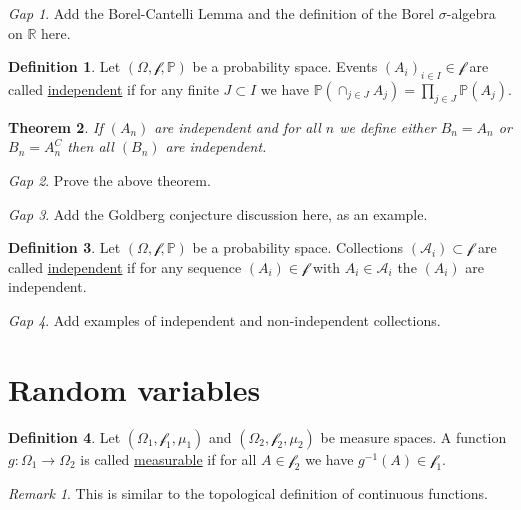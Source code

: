 \documentclass[11pt]{article}
\newcommand{\col}[1]{\mathscr{#1}}
\newcommand{\p}{\mathbb{P}}
\newcommand{\defname}[1]{\underline{#1}}
\newcommand{\RR}{\mathbb{R}}
\theoremstyle{theorem}
\newtheorem{theorem}{Theorem}[section]
\theoremstyle{definition}
\newtheorem{definition}[theorem]{Definition}
\theoremstyle{remark}
\newtheorem*{remark}{Remark}
\theoremstyle{step}
\theoremstyle{gap}
\newtheorem*{gap}{Gap}
\begin{document}
\begin{gap} Add the Borel-Cantelli Lemma and the definition of the Borel \(\sigma\)-algebra on \(\RR\) here.\end{gap}

\begin{definition}
Let \((\Omega, \col{f}, \p)\) be a probability space. Events \((A_i)_{i \in I} \in \col{f}\) are called \defname{independent} if for any finite \(J \subset I\) we have \(\p\left(\cap_{j \in J} A_j\right) = \prod_{j \in J} \p\left(A_j\right)\).
\end{definition}

\begin{theorem}
If \((A_n)\) are independent and for all \(n\) we define either \(B_n = A_n\) or \(B_n = A_n^C\) then all \((B_n)\) are independent.
\end{theorem}

\begin{gap}
Prove the above theorem.
\end{gap}

\begin{gap}
Add the Goldberg conjecture discussion here, as an example.
\end{gap}

\begin{definition}
Let \((\Omega, \col{f}, \p)\) be a probability space. Collections \((\col{A}_i) \subset \col{f}\) are called \defname{independent} if for any sequence \((A_i)\in\col{f}\) with \(A_i \in \col{A}_i\) the \((A_i)\) are independent.
\end{definition}

\begin{gap}
Add examples of independent and non-independent collections.
\end{gap}


\section{Random variables}

\begin{definition}
Let \((\Omega_1, \col{f}_1, \mu_1)\) and \((\Omega_2, \col{f}_2, \mu_2)\) be measure spaces. A function \(g: \Omega_1 \to \Omega_2\) is called \defname{measurable} if for all \(A \in \col{f}_2\) we have \(g^{-1}(A) \in \col{f}_1\).
\end{definition}

\begin{remark}
This is similar to the topological definition of continuous functions.
\end{remark}
\end{document}
